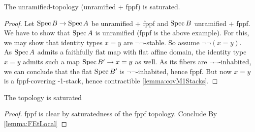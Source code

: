\begin{example}
	The unramified-topology (unramified + fppf) is saturated.
\end{example}
\begin{proof}
	Let $\operatorname{Spec} B \to \operatorname{Spec} A$ be unramified + fppf and $\operatorname{Spec} B$ unramified + fppf. We have to show that $\operatorname{Spec} A$ is unramified (fppf is the above example). For this, we may show that identity types $x = y$ are $\lnot \lnot$-stable. So assume $\lnot \lnot (x = y).$\\
	As $\operatorname{Spec} A$ admits a faithfully flat map with flat affine domain, the identity type $x = y$ admits such a map $\operatorname{Spec} B' \to x = y$ as well. As its fibers are $\lnot \lnot$-inhabited, we can conclude that the flat $\operatorname{Spec} B'$ is $\lnot \lnot $-inhabited, hence fppf. But now $x = y$ is a fppf-covering -1-stack, hence contractible \ref{lemma:covM1Stacks}.
\end{proof}

\begin{lemma}
	The \etale topology is saturated
\end{lemma}
\begin{proof}
	fppf is clear by saturatedness of the fppf topology. %
	Conclude By \ref{lemma:FEtLocal}
\end{proof}
%
%
%
%

